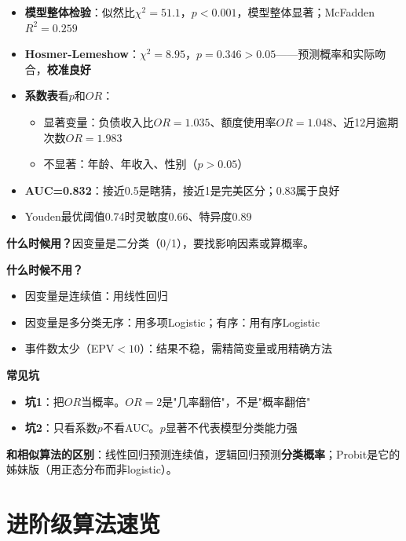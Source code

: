 \begin{algoresult}
\begin{itemize}
    \item \textbf{模型整体检验}：似然比$\chi^2=51.1$，$p<0.001$，模型整体显著；McFadden $R^2=0.259$
    \item \textbf{Hosmer-Lemeshow}：$\chi^2=8.95$，$p=0.346>0.05$——预测概率和实际吻合，\textbf{校准良好}
    \item \textbf{系数表}看$p$和$OR$：
    \begin{itemize}
        \item 显著变量：负债收入比$OR=1.035$、额度使用率$OR=1.048$、近12月逾期次数$OR=1.983$
        \item 不显著：年龄、年收入、性别（$p>0.05$）
    \end{itemize}
    \item \textbf{AUC=0.832}：接近0.5是瞎猜，接近1是完美区分；0.83属于良好
    \item Youden最优阈值0.74时灵敏度0.66、特异度0.89
\end{itemize}
\end{algoresult}

\begin{algonotes}
\textbf{什么时候用？}因变量是二分类（0/1），要找影响因素或算概率。

\textbf{什么时候不用？}
\begin{itemize}
    \item 因变量是连续值：用线性回归
    \item 因变量是多分类无序：用多项Logistic；有序：用有序Logistic
    \item 事件数太少（EPV$<10$）：结果不稳，需精简变量或用精确方法
\end{itemize}

\textbf{常见坑}
\begin{itemize}
    \item \textbf{坑1}：把$OR$当概率。$OR=2$是"几率翻倍"，不是"概率翻倍"
    \item \textbf{坑2}：只看系数$p$不看AUC。$p$显著不代表模型分类能力强
\end{itemize}

\textbf{和相似算法的区别}：线性回归预测连续值，逻辑回归预测\textbf{分类概率}；Probit是它的姊妹版（用正态分布而非logistic）。
\end{algonotes}

\section{进阶级算法速览}

